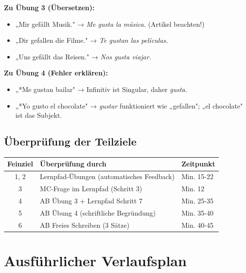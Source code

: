 \documentclass[11pt, a4paper]{article}
\newcommand{\es}[1]{\textcolor{spanisch}{\textit{#1}}}
\begin{document}
\textbf{Zu Übung 3 (Übersetzen):}
\begin{itemize}[leftmargin=2em]
    \item „Mir gefällt Musik." → \es{Me gusta la música.} (Artikel beachten!)
    \item „Dir gefallen die Filme." → \es{Te gustan las películas.}
    \item „Uns gefällt das Reisen." → \es{Nos gusta viajar.}
\end{itemize}

\textbf{Zu Übung 4 (Fehler erklären):}
\begin{itemize}[leftmargin=2em]
    \item „*Me gustan bailar" → Infinitiv ist Singular, daher \es{gusta}.
    \item „*Yo gusto el chocolate" → \es{gustar} funktioniert wie „gefallen"; „el chocolate" ist das Subjekt.
\end{itemize}

\subsection{Überprüfung der Teilziele}

\begin{center}
\begin{tabular}{|c|l|l|}
    \hline
    \textbf{Feinziel} & \textbf{Überprüfung durch} & \textbf{Zeitpunkt} \\
    \hline
    1, 2 & Lernpfad-Übungen (automatisches Feedback) & Min. 15-22 \\
    \hline
    3 & MC-Frage im Lernpfad (Schritt 3) & Min. 12 \\
    \hline
    4 & AB Übung 3 + Lernpfad Schritt 7 & Min. 25-35 \\
    \hline
    5 & AB Übung 4 (schriftliche Begründung) & Min. 35-40 \\
    \hline
    6 & AB Freies Schreiben (3 Sätze) & Min. 40-45 \\
    \hline
\end{tabular}
\end{center}


\section{Ausführlicher Verlaufsplan}
\end{document}
